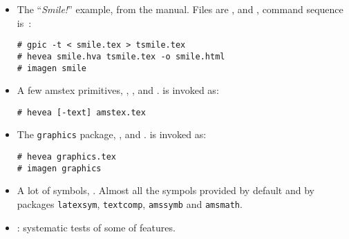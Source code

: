 \documentclass{article}
\begin{document}
\begin{itemize}
\item The ``\emph{Smile!}'' example, from the manual.
Files are ,  and
, command sequence is~:
\begin{verbatim}
# gpic -t < smile.tex > tsmile.tex
# hevea smile.hva tsmile.tex -o smile.html
# imagen smile
\end{verbatim}

\item A few amstex primitives, ,
,  and .
\hevea{} is invoked as:
\begin{verbatim}
# hevea [-text] amstex.tex
\end{verbatim}

\item The \texttt{graphics} package, ,
 and .
\hevea{} is invoked as:
\begin{verbatim}
# hevea graphics.tex
# imagen graphics
\end{verbatim} 

\item A lot of symbols, .
Almost all the sympols provided by default and by packages
\texttt{latexsym},
\texttt{textcomp},
\texttt{amssymb} and \texttt{amsmath}.

\item {}: systematic tests of some of \hevea{} features.
\end{itemize}
\end{document}
